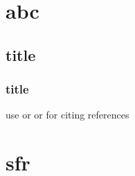 \documentclass[BTech]{iitmdiss}
\begin{document}
%
%
%
%
%
%




\chapter{abc}\label{lit}


\section{title}

\subsection{title}

use \citep{r1} or \cite{r2} or \citet{r1} for citing references


\chapter{sfr}\label{basics}




\appendix

\end{document}
